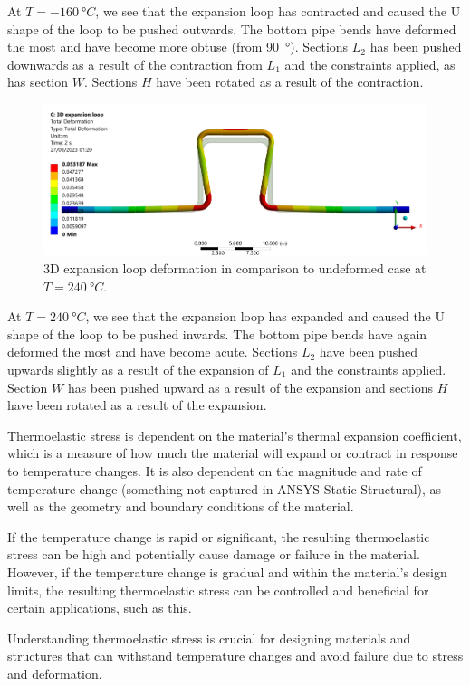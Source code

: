 At $T = \SI{-160}{\degree C}$, we see that the expansion loop has contracted and caused the U shape of the loop to be pushed outwards. The bottom pipe bends have deformed the most and have become more obtuse (from \SI{90}{\degree}). Sections $L_2$ has been pushed downwards as a result of the contraction from $L_1$ and the constraints applied, as has section $W$. Sections $H$ have been rotated as a result of the contraction.
\begin{figure}[H]
    \centering
    \includegraphics[width = \textwidth]{img/part2a-2.png}
    \caption{3D expansion loop deformation in comparison to undeformed case at $T = \SI{240}{\degree C}$.}
    \label{part2a2}
\end{figure}
At $T = \SI{240}{\degree C}$, we see that the expansion loop has expanded and caused the U shape of the loop to be pushed inwards. The bottom pipe bends have again deformed the most and have become acute. Sections $L_2$ have been pushed upwards slightly as a result of the expansion of $L_1$ and the constraints applied. Section $W$ has been pushed upward as a result of the expansion and sections $H$ have been rotated as a result of the expansion.

Thermoelastic stress is dependent on the material's thermal expansion coefficient, which is a measure of how much the material will expand or contract in response to temperature changes. It is also dependent on the magnitude and rate of temperature change (something not captured in ANSYS Static Structural), as well as the geometry and boundary conditions of the material.

If the temperature change is rapid or significant, the resulting thermoelastic stress can be high and potentially cause damage or failure in the material. However, if the temperature change is gradual and within the material's design limits, the resulting thermoelastic stress can be controlled and beneficial for certain applications, such as this.

Understanding thermoelastic stress is crucial for designing materials and structures that can withstand temperature changes and avoid failure due to stress and deformation.
